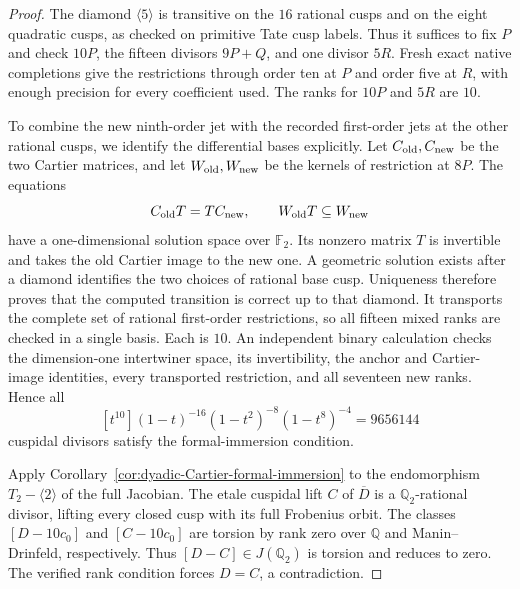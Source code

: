 \begin{proof}
The diamond $\langle5\rangle$ is transitive on the $16$ rational
cusps and on the eight quadratic cusps, as checked on primitive
Tate cusp labels. Thus it suffices to fix $P$ and check $10P$,
the fifteen divisors $9P+Q$, and one divisor $5R$.
Fresh exact native completions give the restrictions through
order ten at $P$ and order five at $R$, with enough precision
for every coefficient used. The ranks for $10P$ and $5R$ are $10$.

To combine the new ninth-order jet with the recorded first-order
jets at the other rational cusps, we identify the differential
bases explicitly. Let $C_{\rm old},C_{\rm new}$ be the two Cartier
matrices, and let $W_{\rm old},W_{\rm new}$ be the kernels of
restriction at $8P$. The equations
\[
 C_{\rm old}T=TC_{\rm new},\qquad
 W_{\rm old}T\subseteq W_{\rm new}
\]
have a one-dimensional solution space over $\mathbb F_2$.
Its nonzero matrix $T$ is invertible and takes the old Cartier
image to the new one. A geometric solution exists after a
diamond identifies the two choices of rational base cusp.
Uniqueness therefore proves that the computed transition is
correct up to that diamond. It transports the complete set of
rational first-order restrictions, so all fifteen mixed ranks
are checked in a single basis. Each is $10$.
An independent binary calculation checks the dimension-one
intertwiner space, its invertibility, the anchor and Cartier-image
identities, every transported restriction, and all seventeen
new ranks. Hence all
\[
 [t^{10}](1-t)^{-16}(1-t^2)^{-8}(1-t^8)^{-4}=9656144
\]
cuspidal divisors satisfy the formal-immersion condition.

Apply Corollary~\ref{cor:dyadic-Cartier-formal-immersion} to the
endomorphism $T_2-\langle2\rangle$ of the full Jacobian.
The etale cuspidal lift $C$ of $\overline D$ is a
$\mathbb Q_2$-rational divisor, lifting every closed cusp with
its full Frobenius orbit. The classes $[D-10c_0]$ and
$[C-10c_0]$ are torsion by rank zero over $\mathbb Q$ and
Manin--Drinfeld, respectively. Thus $[D-C]\in J(\mathbb Q_2)$
is torsion and reduces to zero. The verified rank condition
forces $D=C$, a contradiction.
\end{proof}
